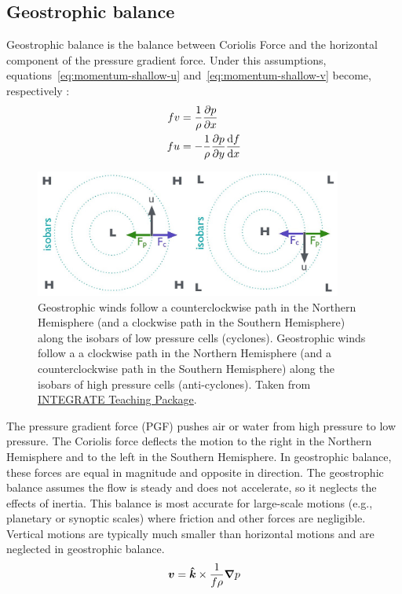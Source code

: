 \subsection{Geostrophic balance}\label{subsec:geostrophic-balance}
Geostrophic balance is the balance between Coriolis Force and the horizontal component of the pressure gradient force.
Under this assumptions, equations~\ref{eq:momentum-shallow-u} and~\ref{eq:momentum-shallow-v} become, respectively
\citep{Gill1982}:
\begin{align}
	f v & = \frac{1}{\rho} \frac{\partial p}{\partial x}                 \\
	f u & = - \frac{1}{\rho} \frac{\partial p}{\partial y} \frac{\mathrm{d}f}{\mathrm{d}x}
\end{align}
\begin{figure}
	\centering
	\includegraphics[width=0.9\textwidth]{figs/geostrophic-balance}
	\caption{
		Geostrophic winds follow a counterclockwise path in the Northern Hemisphere (and a clockwise path in the Southern Hemisphere) along the isobars of low pressure cells (cyclones).
		Geostrophic winds follow a a clockwise path in the Northern Hemisphere (and a counterclockwise path in the Southern Hemisphere) along the isobars of high pressure cells (anti-cyclones).
		Taken from \href{http://integrate.mutz.science}{INTEGRATE Teaching Package}.}
	\label{fig:geostrophic-balance}
\end{figure}
The pressure gradient force (PGF) pushes air or water from high pressure to low pressure. The Coriolis force deflects the motion to the right in the Northern Hemisphere and to the left in the Southern Hemisphere. In geostrophic balance, these forces are equal in magnitude and opposite in direction. The geostrophic balance assumes the flow is steady and does not accelerate, so it neglects the effects of inertia. This balance is most accurate for large-scale motions (e.g., planetary or synoptic scales) where friction and other forces are negligible. Vertical motions are typically much smaller than horizontal motions and are neglected in geostrophic balance.
\begin{equation}
	\vec{v} = \unitv{k} \times \frac{1}{f \rho} \grad p
\end{equation}
